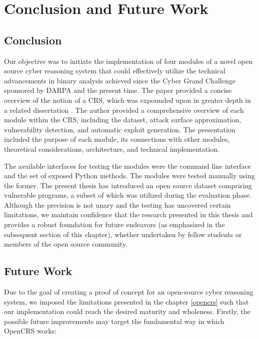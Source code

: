 \documentclass[../main.tex]{subfiles}
\begin{document}
\hypertarget{conclusion}{%
\chapter{Conclusion and Future Work}\label{conclusion_future}}

\hypertarget{conclusion}{%
\section{Conclusion}\label{conclusion}}

Our objective was to initiate the implementation of four modules of a novel open source cyber reasoning system that could effectively utilize the technical advancements in binary analysis achieved since the Cyber Grand Challenge sponsored by DARPA and the present time. The paper provided a concise overview of the notion of a CRS, which was expounded upon in greater depth in a related dissertation \cite{ghenea}. The author provided a comprehensive overview of each module within the CRS, including the dataset, attack surface approximation, vulnerability detection, and automatic exploit generation. The presentation included the purpose of each module, its connections with other modules, theoretical considerations, architecture, and technical implementation.

The available interfaces for testing the modules were the command line interface and the set of exposed Python methods. The modules were tested manually using the former. The present thesis has introduced an open source dataset comprising vulnerable programs, a subset of which was utilized during the evaluation phase. Although the precision is not unary and the testing has uncovered certain limitations, we maintain confidence that the research presented in this thesis and \cite{ghenea} provides a robust foundation for future endeavors (as emphasized in the subsequent section of this chapter), whether undertaken by fellow students or members of the open source community.

\hypertarget{future-work}{%
\section{Future Work}\label{future-work}}

Due to the goal of creating a proof of concept for an open-source cyber
reasoning system, we imposed the limitations presented in the
chapter \ref{opencrs} such that our implementation could reach the desired
maturity and wholeness. Firstly, the possible future improvements may target the
fundamental way in which OpenCRS works:
\end{document}
